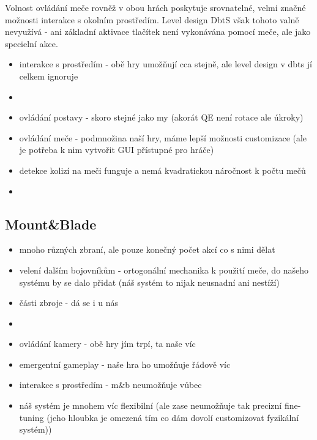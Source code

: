 Volnost ovládání meče rovněž v obou hrách poskytuje srovnatelné, velmi značné možnosti interakce s okolním prostředím. Level design \acl{DbtS} však tohoto valně nevyužívá - ani základní aktivace tlačítek není vykonávána pomocí meče, ale jako specielní akce.  



\pagebreak

\begin{itemize}
    \item interakce s prostředím - obě hry umožňují cca stejně, ale level design v dbts jí celkem ignoruje
    \item 
    \item ovládání postavy - skoro stejné jako my (akorát QE není rotace ale úkroky)
    \item ovládání meče - podmnožina naší hry, máme lepší možnosti customizace (ale je potřeba k nim vytvořit GUI přístupné pro hráče)
    \item detekce kolizí na meči funguje a nemá kvadratickou náročnost k počtu mečů 
    \item 
\end{itemize}

\subsection{Mount\&Blade}

\begin{itemize}
    \item mnoho různých zbraní, ale pouze konečný počet akcí co s nimi dělat
    \item velení dalším bojovníkům - ortogonální mechanika k použití meče, do našeho systému by se dalo přidat (náš systém to nijak neusnadní ani nestíží)
    \item části zbroje - dá se i u nás
    \item 
    \item ovládání kamery - obě hry jím trpí, ta naše víc
    \item emergentní gameplay - naše hra ho umožňuje řádově víc
    \item interakce s prostředím - m\&b neumožňuje vůbec
    \item náš systém je mnohem víc flexibilní (ale zase neumožňuje tak precizní fine-tuning (jeho hloubka je omezená tím co dám dovolí customizovat fyzikální systém))
\end{itemize}

